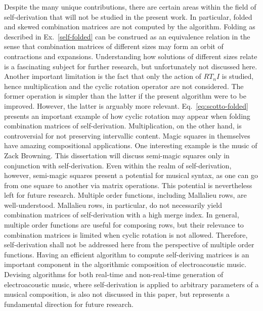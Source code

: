 Despite the many unique contributions, there are certain areas within the field of self-derivation that will not be studied in the present work. In particular, folded and skewed combination matrices are not computed by the algorithm. Folding as described in Ex.~\ref{self-folded} can be construed as an equivalence relation in the sense that combination matrices of different sizes may form an orbit of contractions and expansions. Understanding how solutions of different sizes relate is a fascinating subject for further research, but unfortunately not discussed here. Another important limitation is the fact that only the action of $RT_nI$ is studied, hence multiplication and the cyclic rotation operator are not considered. The former operation is simpler than the latter if the present algorithm were to be improved. However, the latter is arguably more relevant. Eq.~\ref{eq:scotto-folded} presents an important example of how cyclic rotation may appear when folding combination matrices of self-derivation. Multiplication, on the other hand, is controversial for not preserving intervallic content. Magic squares in themselves have amazing compositional applications. One interesting example is the music of Zack Browning. This dissertation will discuss semi-magic squares only in conjunction with self-derivation. Even within the realm of self-derivation, however, semi-magic squares present a potential for musical syntax, as one can go from one square to another via matrix operations. This potential is nevertheless left for future research. Multiple order functions, including Mallalieu rows, are well-understood. Mallalieu rows, in particular, do not necessarily yield combination matrices of self-derivation with a high merge index. In general, multiple order functions are useful for composing rows, but their relevance to combination matrices is limited when cyclic rotation is not allowed. Therefore, self-derivation shall not be addressed here from the perspective of multiple order functions. Having an efficient algorithm to compute self-deriving matrices is an important component in the algorithmic composition of electroacoustic music. Devising algorithms for both real-time and non-real-time generation of electroacoustic music, where self-derivation is applied to arbitrary parameters of a musical composition, is also not discussed in this paper, but represents a fundamental direction for future research.

